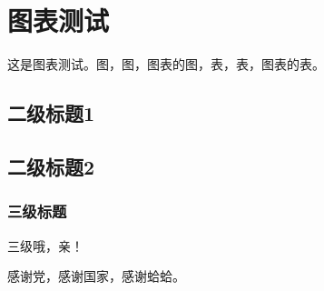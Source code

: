 \documentclass[print]{xjtubsc}
\begin{document}
\section{图表测试}
这是图表测试。图，图，图表的图，表，表，图表的表。
\subsection{二级标题1}
\subsection{二级标题2}
\subsubsection{三级标题}
三级哦，亲！



\backmatter













\begin{acknowledgment}
感谢党，感谢国家，感谢蛤蛤。
\end{acknowledgment}
\end{document}
